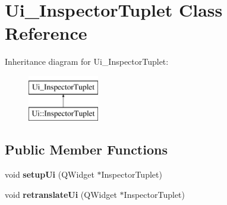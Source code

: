 \hypertarget{class_ui___inspector_tuplet}{}\section{Ui\+\_\+\+Inspector\+Tuplet Class Reference}
\label{class_ui___inspector_tuplet}
Inheritance diagram for Ui\+\_\+\+Inspector\+Tuplet\+:\begin{figure}[H]
\begin{center}
\leavevmode
\includegraphics[height=2.000000cm]{class_ui___inspector_tuplet}
\end{center}
\end{figure}
\subsection*{Public Member Functions}
\begin{DoxyCompactItemize}
\item 
\mbox{\label{class_ui___inspector_tuplet_a1e90e16e603278fa7fd13b6b1c2f2a3c}} 
void {\bfseries setup\+Ui} (Q\+Widget $\ast$Inspector\+Tuplet)
\item 
\mbox{\label{class_ui___inspector_tuplet_a7a5e9fc4ef5fa56f97cc1641be671b86}} 
void {\bfseries retranslate\+Ui} (Q\+Widget $\ast$Inspector\+Tuplet)
\end{DoxyCompactItemize}
